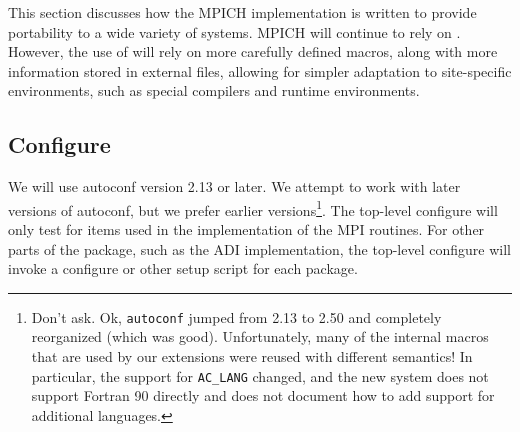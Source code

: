 \documentclass{article}
\begin{document}
This section discusses how the MPICH implementation is written to
provide portability to a wide variety of systems.  MPICH will continue
to rely on .  However, the use of 
will rely on more carefully defined macros, along with more
information stored in external files, allowing for simpler adaptation
to site-specific environments, such as special compilers and runtime
environments. 



\subsection{Configure}
\label{sec:configure}
We will use autoconf version 2.13 or later.
We attempt to work with later versions of autoconf, but we prefer
earlier versions\footnote{Don't ask.  Ok, \texttt{autoconf} jumped from 2.13 to
  2.50 and completely reorganized (which was good).  Unfortunately, many of the
  internal macros that are used by our extensions were reused with
  different semantics!  In particular, the support for
  \texttt{AC_LANG} changed, and the new system does not support
  Fortran 90 directly and does not document how to add support for
  additional languages.}.  The top-level configure will only
test for items used in the implementation of the MPI routines.  For
other parts of the package, such as the ADI implementation, the
top-level configure will invoke a configure or other setup script for
each package.

\end{document}
